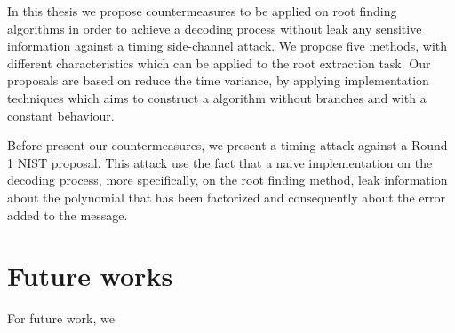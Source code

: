 In this thesis we propose countermeasures to be applied on root finding algorithms in order to achieve a decoding process without leak any sensitive information against a timing side-channel attack. We propose five methods, with different characteristics which can be applied to the root extraction task. Our proposals are based on reduce the time variance, by applying implementation techniques which aims to construct a algorithm without branches and with a constant behaviour. 

Before present our countermeasures, we present a timing attack against a Round 1 NIST proposal. This attack use the fact that a naive implementation on the decoding process, more specifically, on the root finding method, leak information about the polynomial that has been factorized and consequently about the error added to the message. 



\section{Future works}
For future work, we 